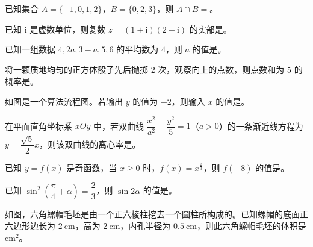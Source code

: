 \begin{question}
已知集合 $A=\{-1,0,1,2\}$，$B=\{0,2,3\}$，则 $A\cap B=$\gkblank{}。

\end{question}
\begin{question}
已知 $\mathrm i$ 是虚数单位，则复数 $z=(1+\mathrm i)(2-\mathrm i)$ 的实部是\gkblank{}。

\end{question}
\begin{question}
已知一组数据 $4,2a,3-a,5,6$ 的平均数为 $4$，则 $a$ 的值是\gkblank{}。

\end{question}
\begin{question}
将一颗质地均匀的正方体骰子先后抛掷 $2$ 次，观察向上的点数，则点数和为 $5$ 的概率是\gkblank{}。

\Needspace{0.4\textheight}
\end{question}
\begin{question}
如图是一个算法流程图。若输出 $y$ 的值为 $-2$，则输入 $x$ 的值是\gkblank{}。
\nopagebreak[4]
\begin{center}\end{center}
\nopagebreak[4]
\end{question}
\begin{question}
在平面直角坐标系 $xOy$ 中，若双曲线 $\dfrac{x^2}{a^2}-\dfrac{y^2}{5}=1$（$a>0$）的一条渐近线方程为 $y=\dfrac{\sqrt5}{2}x$，则该双曲线的离心率是\gkblank{}。

\end{question}
\begin{question}
已知 $y=f(x)$ 是奇函数，当 $x\geqslant0$ 时，$f(x)=x^{\frac23}$，则 $f(-8)$ 的值是\gkblank{}。

\end{question}
\begin{question}
已知 $\sin^2\left(\dfrac\pi4+\alpha\right)=\dfrac23$，则 $\sin2\alpha$ 的值是\gkblank{}。

\Needspace{0.4\textheight}
\end{question}
\begin{question}
如图，六角螺帽毛坯是由一个正六棱柱挖去一个圆柱所构成的。已知螺帽的底面正六边形边长为 $2\ \mathrm{cm}$，高为 $2\ \mathrm{cm}$，内孔半径为 $0.5\ \mathrm{cm}$，则此六角螺帽毛坯的体积是\gkblank{}$\mathrm{cm}^2$。
\nopagebreak[4]
\begin{center}\end{center}
\nopagebreak[4]
\end{question}
